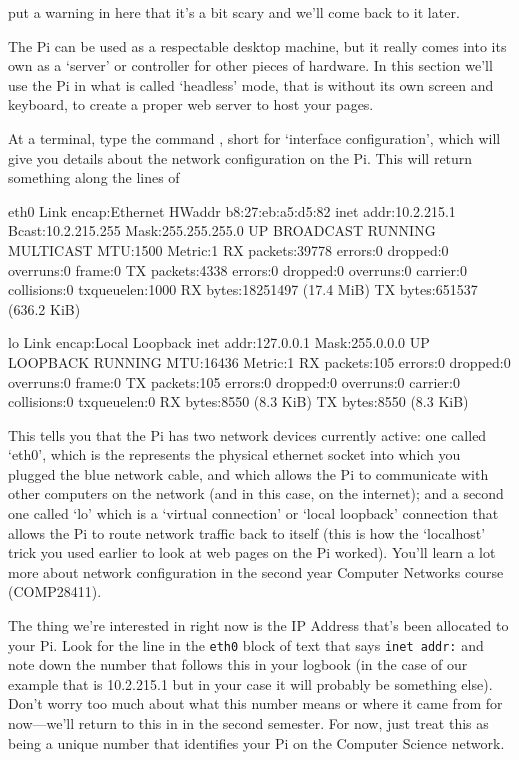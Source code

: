 \begin{note}
put a warning in here that it's a bit scary and we'll come back to it later.
\end{note}



The Pi can be used as a respectable desktop machine, but it really comes into its own as a `server' or controller for other pieces of hardware. In this section we'll use the Pi in what is called `headless' mode, that is without its own screen and keyboard, to create a proper web server to host your pages. 

At a terminal, type the command , short for `interface configuration', which will give you details about the network configuration on the Pi. This will return something along the lines of

\begin{ttoutenv}
eth0      Link encap:Ethernet  HWaddr b8:27:eb:a5:d5:82
          inet addr:10.2.215.1  Bcast:10.2.215.255  Mask:255.255.255.0
          UP BROADCAST RUNNING MULTICAST  MTU:1500  Metric:1
          RX packets:39778 errors:0 dropped:0 overruns:0 frame:0
          TX packets:4338 errors:0 dropped:0 overruns:0 carrier:0
          collisions:0 txqueuelen:1000
          RX bytes:18251497 (17.4 MiB)  TX bytes:651537 (636.2 KiB)

lo        Link encap:Local Loopback
          inet addr:127.0.0.1  Mask:255.0.0.0
          UP LOOPBACK RUNNING  MTU:16436  Metric:1
          RX packets:105 errors:0 dropped:0 overruns:0 frame:0
          TX packets:105 errors:0 dropped:0 overruns:0 carrier:0
          collisions:0 txqueuelen:0
          RX bytes:8550 (8.3 KiB)  TX bytes:8550 (8.3 KiB)
\end{ttoutenv}

This tells you that the Pi has two network devices currently active: one called `eth0', which is the represents the physical ethernet socket into which you plugged the blue network cable, and which allows the Pi to communicate with other computers on the network (and in this case, on the internet); and a second one called `lo' which is a `virtual connection' or `local loopback' connection that allows the Pi to route network traffic back to itself (this is how the `localhost' trick you used earlier to look at web pages on the Pi worked). You'll learn a lot more about network configuration in the second year Computer Networks course (COMP28411). 

The thing we're interested in right now is the IP Address that's been allocated to your Pi. Look for the line in the \texttt{eth0} block of text that says \texttt{inet addr:} and note down the number that follows this in your logbook (in the case of our example that is 10.2.215.1 but in your case it will probably be something else). Don't worry too much about what this number means or where it came from for now---we'll return to this in  in the second semester. For now, just treat this as being a unique number that identifies your Pi on the Computer Science network. 

